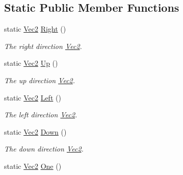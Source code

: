 \subsection*{Static Public Member Functions}
\begin{DoxyCompactItemize}
\item 
\hypertarget{classgfxmath_1_1_vec2_ad2ad242abc441daf636e6528582f6b29}{}static \hyperlink{classgfxmath_1_1_vec2}{Vec2} \hyperlink{classgfxmath_1_1_vec2_ad2ad242abc441daf636e6528582f6b29}{Right} ()\label{classgfxmath_1_1_vec2_ad2ad242abc441daf636e6528582f6b29}

\begin{DoxyCompactList}\small\item\em The right direction \hyperlink{classgfxmath_1_1_vec2}{Vec2}. \end{DoxyCompactList}\item 
\hypertarget{classgfxmath_1_1_vec2_a549d974b639ee8362cf8de80e59090ab}{}static \hyperlink{classgfxmath_1_1_vec2}{Vec2} \hyperlink{classgfxmath_1_1_vec2_a549d974b639ee8362cf8de80e59090ab}{Up} ()\label{classgfxmath_1_1_vec2_a549d974b639ee8362cf8de80e59090ab}

\begin{DoxyCompactList}\small\item\em The up direction \hyperlink{classgfxmath_1_1_vec2}{Vec2}. \end{DoxyCompactList}\item 
\hypertarget{classgfxmath_1_1_vec2_af27cd6811851ec0ae67154bf3764a53f}{}static \hyperlink{classgfxmath_1_1_vec2}{Vec2} \hyperlink{classgfxmath_1_1_vec2_af27cd6811851ec0ae67154bf3764a53f}{Left} ()\label{classgfxmath_1_1_vec2_af27cd6811851ec0ae67154bf3764a53f}

\begin{DoxyCompactList}\small\item\em The left direction \hyperlink{classgfxmath_1_1_vec2}{Vec2}. \end{DoxyCompactList}\item 
\hypertarget{classgfxmath_1_1_vec2_aa6ceaed20893b0491f371a782446c927}{}static \hyperlink{classgfxmath_1_1_vec2}{Vec2} \hyperlink{classgfxmath_1_1_vec2_aa6ceaed20893b0491f371a782446c927}{Down} ()\label{classgfxmath_1_1_vec2_aa6ceaed20893b0491f371a782446c927}

\begin{DoxyCompactList}\small\item\em The down direction \hyperlink{classgfxmath_1_1_vec2}{Vec2}. \end{DoxyCompactList}\item 
\hypertarget{classgfxmath_1_1_vec2_ac57fd3df1e7fe17c17af0309a58659ef}{}static \hyperlink{classgfxmath_1_1_vec2}{Vec2} \hyperlink{classgfxmath_1_1_vec2_ac57fd3df1e7fe17c17af0309a58659ef}{One} ()\label{classgfxmath_1_1_vec2_ac57fd3df1e7fe17c17af0309a58659ef}


\end{DoxyCompactItemize}
